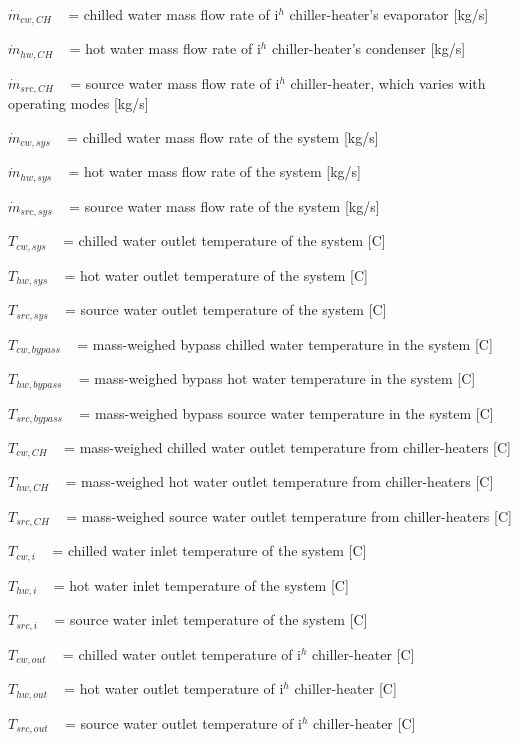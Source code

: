 \({\dot m_{cw,CH}}\) ~ = chilled water mass flow rate of i\(^{h}\) chiller-heater's evaporator {[}kg/s{]}

\({\dot m_{hw,CH}}\) ~ = hot water mass flow rate of i\(^{h}\) chiller-heater's condenser {[}kg/s{]}

\({\dot m_{src,CH}}\) ~ = source water mass flow rate of i\(^{h}\) chiller-heater, which varies with operating modes {[}kg/s{]}

\({\dot m_{cw,sys}}\) ~ = chilled water mass flow rate of the system {[}kg/s{]}

\({\dot m_{hw,sys}}\) ~ = hot water mass flow rate of the system {[}kg/s{]}

\({\dot m_{src,sys}}\) ~ = source water mass flow rate of the system {[}kg/s{]}

\({T_{cw,sys}}\) ~ = chilled water outlet temperature of the system {[}C{]}

\({T_{hw,sys}}\) ~ = hot water outlet temperature of the system {[}C{]}

\({T_{src,sys}}\) ~ = source water outlet temperature of the system {[}C{]}

\({T_{cw,bypass}}\) ~ = mass-weighed bypass chilled water temperature in the system {[}C{]}

\({T_{hw,bypass}}\) ~ = mass-weighed bypass hot water temperature in the system {[}C{]}

\({T_{src,bypass}}\) ~ = mass-weighed bypass source water temperature in the system {[}C{]}

\({T_{cw,CH}}\) ~ = mass-weighed chilled water outlet temperature from chiller-heaters {[}C{]}

\({T_{hw,CH}}\) ~ = mass-weighed hot water outlet temperature from chiller-heaters {[}C{]}

\({T_{src,CH}}\) ~ = mass-weighed source water outlet temperature from chiller-heaters {[}C{]}

\({T_{cw,i}}\) ~ = chilled water inlet temperature of the system {[}C{]}

\({T_{hw,i}}\) ~ = hot water inlet temperature of the system {[}C{]}

\({T_{src,i}}\) ~ = source water inlet temperature of the system {[}C{]}

\({T_{cw,out}}\) ~ = chilled water outlet temperature of i\(^{h}\) chiller-heater {[}C{]}

\({T_{hw,out}}\) ~ = hot water outlet temperature of i\(^{h}\) chiller-heater {[}C{]}

\({T_{src,out}}\) ~ = source water outlet temperature of i\(^{h}\) chiller-heater {[}C{]}

